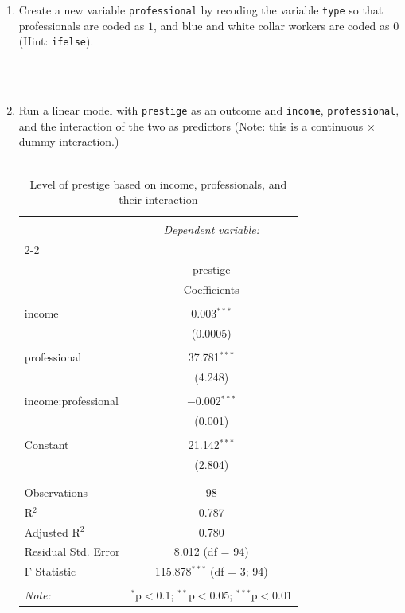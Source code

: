 \documentclass[12pt,letterpaper]{article}
\begin{document}
\newpage
\begin{enumerate}
	
	\item [(a)]
	Create a new variable \texttt{professional} by recoding the variable \texttt{type} so that professionals are coded as $1$, and blue and white collar workers are coded as $0$ (Hint: \texttt{ifelse}).
	
		\\\\
		
	\vspace{1cm}
	
	
	\item [(b)]
	Run a linear model with \texttt{prestige} as an outcome and \texttt{income}, \texttt{professional}, and the interaction of the two as predictors (Note: this is a continuous $\times$ dummy interaction.)
			\\\\
	\begin{table}[!htbp] \centering 
		\caption{Level of prestige based on income, professionals, and their interaction} 
		\label{} 
		\begin{tabular}{@{\extracolsep{5pt}}lc} 
			\\[-1.8ex]\hline 
			\hline \\[-1.8ex] 
			& \multicolumn{1}{c}{\textit{Dependent variable:}} \\ 
			\cline{2-2} 
			\\[-1.8ex] & prestige \\ 
			& Coefficients \\ 
			\hline \\[-1.8ex] 
			income & 0.003$^{***}$ \\ 
			& (0.0005) \\ 
			& \\ 
			professional & 37.781$^{***}$ \\ 
			& (4.248) \\ 
			& \\ 
			income:professional & $-$0.002$^{***}$ \\ 
			& (0.001) \\ 
			& \\ 
			Constant & 21.142$^{***}$ \\ 
			& (2.804) \\ 
			& \\ 
			\hline \\[-1.8ex] 
			Observations & 98 \\ 
			R$^{2}$ & 0.787 \\ 
			Adjusted R$^{2}$ & 0.780 \\ 
			Residual Std. Error & 8.012 (df = 94) \\ 
			F Statistic & 115.878$^{***}$ (df = 3; 94) \\ 
			\hline 
			\hline \\[-1.8ex] 
			\textit{Note:}  & \multicolumn{1}{r}{$^{*}$p$<$0.1; $^{**}$p$<$0.05; $^{***}$p$<$0.01} \\ 
		\end{tabular} 
	\end{table} 
	

\end{enumerate}
\end{document}
